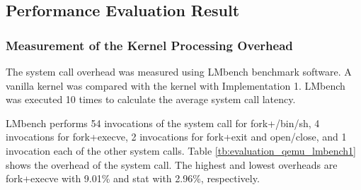 

\subsection{Performance Evaluation Result}

\subsubsection{Measurement of the Kernel Processing Overhead}

The system call overhead was measured using LMbench benchmark software. 
%
A vanilla kernel was compared with the kernel with Implementation 1.
LMbench was executed 10 times to calculate the average system call latency.

LMbench performs 54 invocations of the system call for fork+/bin/sh, 4 invocations
for fork+execve, 2 invocations for fork+exit and open/close, and 1
invocation each of the other system calls.
Table \ref{tb:evaluation_qemu_lmbench1} shows the overhead of the system call. The
highest and lowest overheads are fork+execve with 9.01\% and stat with 2.96\%,
respectively.


